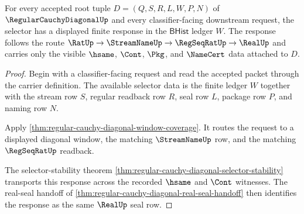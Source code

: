 \begin{theorem}
\label{thm:regular-cauchy-diagonal-root-selector-totality}
For every accepted root tuple $D=(Q,S,R,L,W,P,N)$ of $\RegularCauchyDiagonalUp$ and every classifier-facing downstream request, the selector has a displayed finite response in the $\mathsf{BHist}$ ledger $W$. The response follows the route $\RatUp \to \StreamNameUp \to \RegSeqRatUp \to \RealUp$ and carries only the visible $\hsame$, $\Cont$, $\Pkg$, and $\NameCert$ data attached to $D$.
\end{theorem}
\begin{proof}
Begin with a classifier-facing request and read the accepted packet through the carrier definition. The available selector data is the finite ledger $W$ together with the stream row $S$, regular readback row $R$, seal row $L$, package row $P$, and naming row $N$.

Apply \autoref{thm:regular-cauchy-diagonal-window-coverage}. It routes the request to a displayed diagonal window, the matching $\StreamNameUp$ row, and the matching $\RegSeqRatUp$ readback.

The selector-stability theorem \autoref{thm:regular-cauchy-diagonal-selector-stability} transports this response across the recorded $\hsame$ and $\Cont$ witnesses. The real-seal handoff of \autoref{thm:regular-cauchy-diagonal-real-seal-handoff} then identifies the response as the same $\RealUp$ seal row.
\end{proof}

